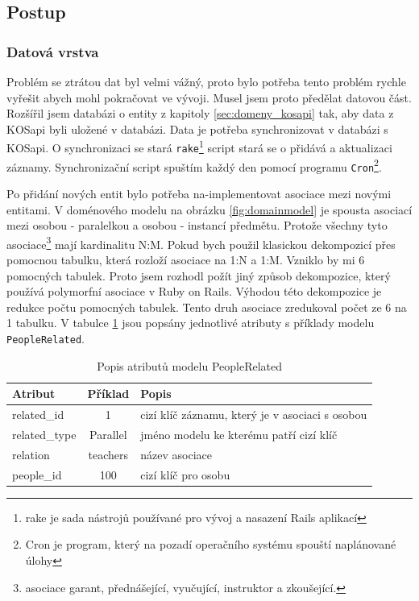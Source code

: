 \subsection{Postup}
\subsubsection{Datová vrstva}
Problém se ztrátou dat byl velmi vážný, proto bylo potřeba tento problém rychle vyřešit abych mohl pokračovat ve vývoji. Musel jsem proto předělat datovou část. Rozšířil jsem databázi o entity z kapitoly \ref{sec:domeny_kosapi} tak, aby data z KOSapi byli uložené v databázi. Data je potřeba synchronizovat v databázi s KOSapi. O synchronizaci se stará \verb|rake|\footnote{rake je sada nástrojů používané pro vývoj a nasazení Rails aplikací} script stará se o přidává a aktualizaci záznamy. Synchronizační script  spuštím každý den pomocí programu \verb|Cron|\footnote{Cron je program, který na pozadí operačního systému spouští naplánované úlohy}.

Po přidání nových entit bylo potřeba na-implementovat asociace mezi novými entitami. V doménového modelu na obrázku \ref{fig:domainmodel} je spousta asociací mezi osobou - paralelkou a osobou - instancí předmětu. Protože všechny tyto asociace\footnote{asociace garant, přednášející, vyučující, instruktor a zkoušející.} mají kardinalitu N:M. Pokud bych použil klasickou dekompozicí přes pomocnou tabulku, která rozloží asociace na 1:N a 1:M. Vzniklo by mi 6 pomocných tabulek. Proto jsem rozhodl požít jiný způsob dekompozice, který používá polymorfní asociace \cite{guide_pa} v Ruby on Rails. Výhodou této  dekompozice je redukce počtu pomocných tabulek. Tento druh asociace zredukoval počet ze 6 na 1 tabulku. V tabulce \ref{tab:people_related} jsou popsány jednotlivé atributy s příklady modelu \verb|PeopleRelated|.

\begin{table}[h]
\begin{center}
\begin{tabular}{|l|c|l|}

\hline
\textbf{Atribut} & \textbf{Příklad} & \textbf{Popis} \\ \hline
related\_id & 1 & cizí klíč záznamu, který je v asociaci s osobou \\\hline
related\_type & Parallel & jméno modelu ke kterému patří cizí klíč \\ \hline
relation & teachers & název asociace \\\hline
people\_id & 100 & cizí klíč pro osobu  \\\hline

\end{tabular}
\caption{Popis atributů modelu PeopleRelated}
\label{tab:people_related}
\end{center}
\end{table}


